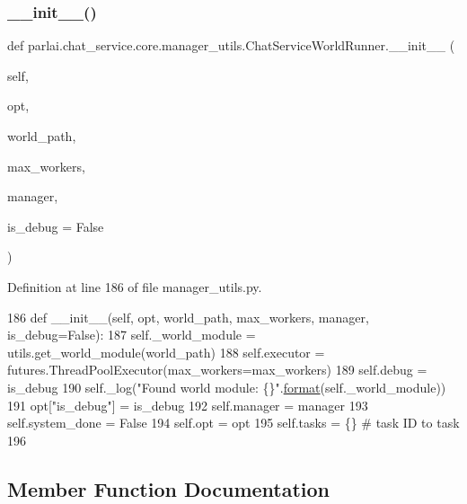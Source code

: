 \subsubsection{\texorpdfstring{\+\_\+\+\_\+init\+\_\+\+\_\+()}{\_\_init\_\_()}}
{\footnotesize\ttfamily def parlai.\+chat\+\_\+service.\+core.\+manager\+\_\+utils.\+Chat\+Service\+World\+Runner.\+\_\+\+\_\+init\+\_\+\+\_\+ (\begin{DoxyParamCaption}\item[{}]{self,  }\item[{}]{opt,  }\item[{}]{world\+\_\+path,  }\item[{}]{max\+\_\+workers,  }\item[{}]{manager,  }\item[{}]{is\+\_\+debug = {\ttfamily False} }\end{DoxyParamCaption})}



Definition at line 186 of file manager\+\_\+utils.\+py.


\begin{DoxyCode}
186     \textcolor{keyword}{def }\_\_init\_\_(self, opt, world\_path, max\_workers, manager, is\_debug=False):
187         self.\_world\_module = utils.get\_world\_module(world\_path)
188         self.executor = futures.ThreadPoolExecutor(max\_workers=max\_workers)
189         self.debug = is\_debug
190         self.\_log(\textcolor{stringliteral}{"Found world module: \{\}"}.\hyperlink{namespaceparlai_1_1chat__service_1_1services_1_1messenger_1_1shared__utils_a32e2e2022b824fbaf80c747160b52a76}{format}(self.\_world\_module))
191         opt[\textcolor{stringliteral}{"is\_debug"}] = is\_debug
192         self.manager = manager
193         self.system\_done = \textcolor{keyword}{False}
194         self.opt = opt
195         self.tasks = \{\}  \textcolor{comment}{# task ID to task}
196 
\end{DoxyCode}


\subsection{Member Function Documentation}
\mbox{\label{classparlai_1_1chat__service_1_1core_1_1manager__utils_1_1ChatServiceWorldRunner_a3333ef43d6fb9f0ffcc79b8e639967b0}} 
